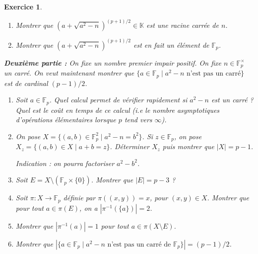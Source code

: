 \documentclass[11pt,a4paper]{article}
\newtheorem{ex}{Exercice}
\newcommand{\F}{\mathbb{F}}
\begin{document}
\begin{ex}
\begin{enumerate}
\item Montrer que $(a+\sqrt{a^2-n})^{(p+1)/2}\in \mathbb{K}$ est une racine carrée de $n$.

\item  Montrer que $(a+\sqrt{a^2-n})^{(p+1)/2}$ est en fait un élément de $\F_p$.
\end{enumerate}

\textbf{Deuxième partie :} On fixe un nombre premier impair positif. On fixe $n\in \F_p^\times$ un carré. On veut maintenant montrer que  $\{a\in \F_p\mid a^2-n\text{ n'est pas un carré} \}$ est de cardinal $(p-1)/2$. 

\begin{enumerate}


\item Soit $a\in \F_p$. Quel calcul permet de vérifier rapidement si $a^2-n$ est un carré ? Quel est le coût en temps de ce calcul (i.e le nombre asymptotiques d'opérations élémentaires lorsque $p$ tend vers $\infty$). 

\item On pose $X=\{(a,b)\in \F_p^2\mid a^2-n=b^2\}$. Si $z\in \F_p$, on pose $X_z=\{(a,b)\in X\mid a+b=z\}$. Déterminer $X_z$ puis montrer que $|X|=p-1$. 

\textit{Indication : on pourra factoriser $a^2-b^2$.}


\item Soit $E=X\setminus (\F_p\times \{0\})$. Montrer que $|E|=p-3$ ?


\item Soit $\pi:X\rightarrow \F_p$ définie par $\pi((x,y))=x$, pour $(x,y)\in X$. Montrer que pour tout $a\in \pi(E)$, on a $|\pi^{-1}(\{a\})|=2$. 

\item Montrer que $|\pi^{-1}(a)|=1$ pour tout $a\in  \pi(X\setminus E)$.

\item Montrer que   $|\{a\in \F_p\mid a^2-n\text{ n'est pas un carré de }\F_p\}|=(p-1)/2$.


\end{enumerate}



\end{ex}
\end{document}
